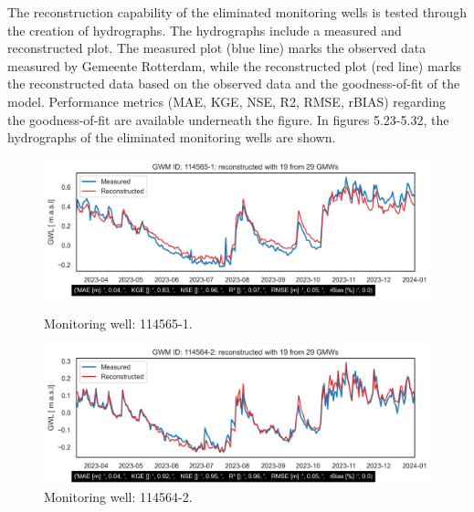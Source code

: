 The reconstruction capability of the eliminated monitoring wells is tested through the creation of hydrographs. The hydrographs include a measured and reconstructed plot. The measured plot (blue line) marks the observed data measured by Gemeente Rotterdam, while the reconstructed plot (red line) marks the reconstructed data based on the observed data and the goodness-of-fit of the model. Performance metrics (MAE, KGE, NSE, R2, RMSE, rBIAS) regarding the goodness-of-fit are available underneath the figure. In figures 5.23-5.32, the hydrographs of the eliminated monitoring wells are shown. 

\begin{figure}[htbp]
    \centering
    \begin{minipage}{0.48\textwidth}
        \centering
        \includegraphics[width=\linewidth]{GWM_reconstructed114565-1.png}
        \caption{Monitoring well: 114565-1.}
        \label{fig:gwm-114565-1}
    \end{minipage}\hfill
    \begin{minipage}{0.48\textwidth}
        \centering
        \includegraphics[width=\linewidth]{GWM_reconstructed114564-2.png}
        \caption{Monitoring well: 114564-2.}
        \label{fig:gwm-114564-2}
    \end{minipage}
    

\end{figure}
